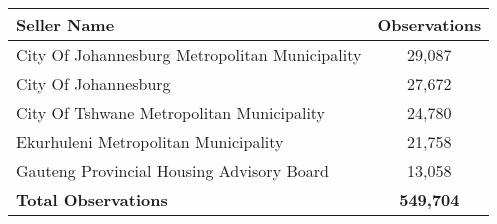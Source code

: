 \begin{tabu}{lc}
\toprule
 Seller Name & Observations \\
\midrule
City Of Johannesburg Metropolitan Municipality & 29,087  \\
City Of Johannesburg & 27,672  \\
City Of Tshwane Metropolitan Municipality & 24,780  \\
Ekurhuleni Metropolitan Municipality & 21,758  \\
Gauteng Provincial Housing Advisory Board & 13,058  \\
{\bf Total Observations }& {\bf 549,704}  \\
\bottomrule
\end{tabu}
